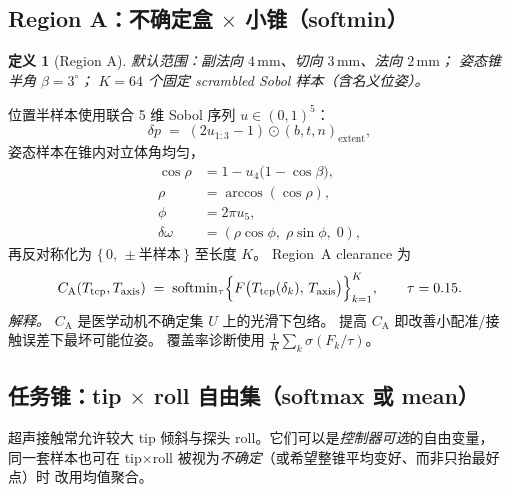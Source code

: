 \documentclass[UTF8,a4paper,11pt,fontset=fandol]{ctexart}
\newtheorem{definition}{定义}
\newcommand{\Tcp}{T_{\mathrm{tcp}}}
\newcommand{\Taxis}{T_{\mathrm{axis}}}
\newcommand{\softmin}{\operatorname{softmin}}
\begin{document}
\subsection{\texorpdfstring{Region A：不确定盒 $\times$ 小锥（softmin）}{Region A：不确定盒 x 小锥（softmin）}}
\label{sec:region-a}

\begin{definition}[Region A]
默认范围：副法向 \(4\,\mathrm{mm}\)、切向 \(3\,\mathrm{mm}\)、法向 \(2\,\mathrm{mm}\)；
姿态锥半角 \(\beta=3^{\circ}\)；
\(K=64\) 个固定 scrambled Sobol 样本（含名义位姿）。
\end{definition}

位置半样本使用联合 5 维 Sobol 序列 \(u\in(0,1)^{5}\)：
\begin{equation}
\label{eq:region-pos}
  \delta p
  \;=\;
  (2u_{1:3}-1)\odot
  (b,t,n)_{\mathrm{extent}},
\end{equation}
姿态样本在锥内对立体角均匀，
\begin{equation}
\label{eq:region-ori}
\begin{aligned}
  \cos\rho
  &=
  1-u_{4}\bigl(1-\cos\beta\bigr),
  \\
  \rho
  &=
  \arccos(\cos\rho),
  \\
  \phi
  &=
  2\pi u_{5},
  \\
  \delta\omega
  &=
  (\rho\cos\phi,\;\rho\sin\phi,\;0),
\end{aligned}
\end{equation}
再反对称化为 \(\{\,0,\,\pm\text{半样本}\,\}\) 至长度 \(K\)。
Region~A clearance 为
\begin{equation}
\label{eq:region-a}
  C_{\mathrm{A}}(\Tcp,\Taxis)
  \;=\;
  \softmin_{\tau}
  \Bigl\{
    F\bigl(\Tcp(\delta_{k}),\,\Taxis\bigr)
  \Bigr\}_{k=1}^{K},
  \qquad
  \tau=0.15.
\end{equation}
\emph{解释。}
\(C_{\mathrm{A}}\) 是医学动机不确定集 \(U\) 上的光滑下包络。
提高 \(C_{\mathrm{A}}\) 即改善小配准/接触误差下最坏可能位姿。
覆盖率诊断使用 \(\frac{1}{K}\sum_{k}\sigma(F_{k}/\tau)\)。

\subsection{\texorpdfstring{任务锥：tip $\times$ roll 自由集（softmax 或 mean）}{任务锥：tip x roll 自由集（softmax 或 mean）}}
\label{sec:task-cone}

超声接触常允许较大 tip 倾斜与探头 roll。它们可以是\emph{控制器可选}的自由变量，
同一套样本也可在 tip$\times$roll 被视为\emph{不确定}（或希望整锥平均变好、而非只抬最好点）时
改用均值聚合。
\end{document}
